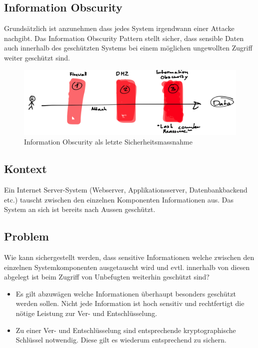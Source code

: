 \subsection{Information Obscurity}

Grundsätzlich ist anzunehmen dass jedes System irgendwann einer Attacke nachgibt. Das Information Obscurity Pattern stellt sicher, dass sensible Daten auch innerhalb des geschützten Systems bei einem möglichen ungewollten Zugriff weiter geschützt sind.

\begin{figure}[H]
	\centering
	\includegraphics[width=12cm]{content/security/secure-internet-applications/images/information-obscurity-overview.png}
	\caption{Information Obscurity als letzte Sicherheitsmassnahme}
\end{figure}

\subsection*{Kontext}
Ein Internet Server-System (Webserver, Applikationsserver, Datenbankbackend etc.) tauscht zwischen den einzelnen Komponenten Informationen aus. Das System an sich ist bereits nach Aussen geschützt.

\subsection*{Problem}
Wie kann sichergestellt werden, dass sensitive Informationen welche zwischen den einzelnen Systemkomponenten ausgetauscht wird und evtl. innerhalb von diesen abgelegt ist beim Zugriff von Unbefugten weiterhin geschützt sind?

\begin{itemize}
	\item Es gilt abzuwägen welche Informationen überhaupt besonders geschützt werden sollen. Nicht jede Information ist hoch sensitiv und rechtfertigt die nötige Leistung zur Ver- und Entschlüsselung.
	\item Zu einer Ver- und Entschlüsselung sind entsprechende kryptographische Schlüssel notwendig. Diese gilt es wiederum entsprechend zu sichern.
\end{itemize}

